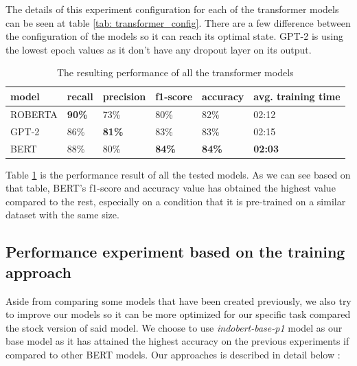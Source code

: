 The details of this experiment configuration for each of the transformer models can be seen at table \ref{tab: transformer_config}. There are a few difference between the configuration of the models so it can reach its optimal state. GPT-2 is using the lowest epoch values as it don't have any dropout layer on its output.

\begin{table}[h]
  \centering
  \caption{The resulting performance of all the transformer models}
  \label{tab: model_transformer_result}
  \begin{tabular}{|l|l|l|l|l|p{.12\linewidth}|}
    \hline
    \textbf{model} & \textbf{recall} & \textbf{precision} & \textbf{f1-score} & \textbf{accuracy} & \textbf{avg. training time} \\ \hline
    ROBERTA        & \textbf{90\%}   & 73\%               & 80\%              & 82\%              & 02:12                       \\ \hline
    GPT-2          & 86\%            & \textbf{81\%}      & 83\%              & 83\%              & 02:15                       \\ \hline
    BERT           & 88\%            & 80\%               & \textbf{84\%}     & \textbf{84\%}     & \textbf{02:03}              \\ \hline
  \end{tabular}
\end{table}

Table \ref{tab: model_transformer_result} is the performance result of all the tested models. As we can see based on that table, BERT's f1-score and accuracy value has obtained the highest value compared to the rest, especially on a condition that it is pre-trained on a similar dataset with the same size.

\subsection{Performance experiment based on the training approach}

Aside from comparing some models that have been created previously, we also try to improve our models so it can be more optimized for our specific task compared the stock version of said model. We choose to use \textit{indobert-base-p1} model as our base model as it has attained the highest accuracy on the previous experiments if compared to other BERT models. Our approaches is described in detail below :

